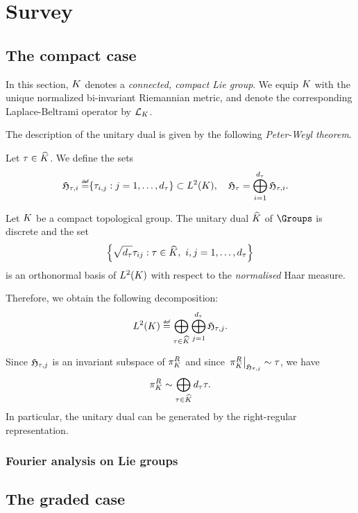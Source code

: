 \chapter{Survey}

\section{The compact case}

In this section,
$\CompactGroup$ denotes a \emph{connected, compact Lie group}.
We equip $\CompactGroup$ with the unique normalized bi-invariant Riemannian metric,
and denote the corresponding Laplace-Beltrami operator by $\Laplacian [\CompactGroup]$.

The description of the unitary dual is given by the following \emph{Peter-Weyl theorem}.

\begin{definition}
    Let $\tau \in \dualGroup\CompactGroup$.
    We define the sets
    \begin{align*}
        \HilbertCompactGroupColumn{\tau}{i} \defeq \span \{ \tau_{i, j} : j = 1, \dots, \dimRep\tau \}
        \subset \Lebesgue{2}\CompactGroup, \quad
        \HilbertCompactGroup{\tau} = \bigoplus_{i = 1}^\dimRep\tau \HilbertCompactGroupColumn{\tau}{i}.
    \end{align*}
\end{definition}

\begin{theorem}
\label{theorem:Peter-Weyl_theorem}
    Let $\CompactGroup$ be a compact topological group.
    The unitary dual $\dualGroup \CompactGroup$ of $\Groups$ is discrete and
    the set
    \begin{align*}
        \left\{
            \sqrt{\dimRep\tau} \tau_{ij} : \tau \in \dualGroup\CompactGroup,\ i, j = 1, \dots, \dimRep\tau
        \right\}
    \end{align*}
    is an orthonormal basis of $\Lebesgue{2}{\CompactGroup}$ with respect to the \emph{normalised} Haar measure.

    Therefore, we obtain the following decomposition:
    \begin{align*}
        \Lebesgue{2}{\CompactGroup} \defeq
        \bigoplus_{\tau \in \dualGroup\CompactGroup} \bigoplus_{j = 1}^{\dimRep \tau} \Hilbert{\tau}{j}.
    \end{align*}

    Since $\Hilbert{\tau}{j}$ is an invariant subspace of $\RightRegularRepresentation$
    and since $\eval{\RightRegularRepresentation}{\Hilbert{\tau}{j}} \sim \tau$,
    we have
    \begin{align*}
        \RightRegularRepresentation \sim
        \bigoplus_{\tau \in \dualGroup\CompactGroup} \dimRep\tau \tau.
    \end{align*}
    In particular, the unitary dual can be generated by the right-regular representation.
\end{theorem}

\subsection{Fourier analysis on Lie groups}

\section{The graded case}
